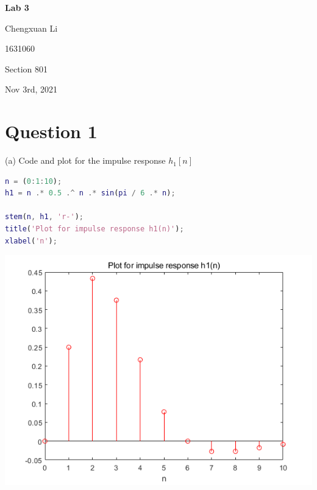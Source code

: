 \documentclass{article}
\begin{document}
\begin{titlepage}
\begin{center}
\vspace*{1cm}
		
\textbf{Lab 3}
			
\vspace{0.5cm}
Chengxuan Li
			
\vspace{0.1cm}
1631060
			
\vspace{0.1cm}
Section 801
			
\vspace{0.1cm}
Nov 3rd, 2021
\end{center}
\end{titlepage}

\section*{Question 1}
(a) Code and plot for the impulse response $h_{1}[n]$
\begin{lstlisting}[language=Matlab]
n = (0:1:10);
h1 = n .* 0.5 .^ n .* sin(pi / 6 .* n);

stem(n, h1, 'r-');
title('Plot for impulse response h1(n)');
xlabel('n');
\end{lstlisting}

\includegraphics[width=\textwidth]{QuestionOneA.png}
\end{document}
